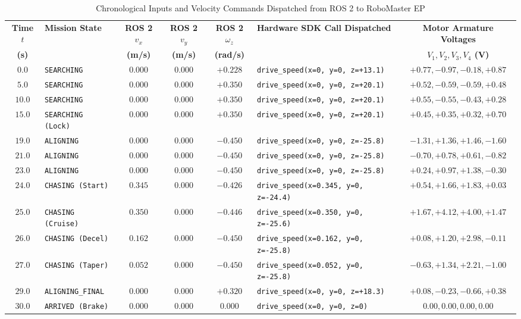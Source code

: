 \documentclass[10pt,a4paper]{article}
\begin{document}
\begin{table}[h!]
\centering
\caption{Chronological Inputs and Velocity Commands Dispatched from ROS 2 to RoboMaster EP}
\label{tab:commands_timeline}
\vspace{0.04cm}
\scriptsize
\begin{tabular*}{\textwidth}{@{\extracolsep{\fill}}c l c c c l c}
\toprule
\textbf{Time $t$} & \textbf{Mission State} & \textbf{ROS 2 $v_x$} & \textbf{ROS 2 $v_y$} & \textbf{ROS 2 $\omega_z$} & \textbf{Hardware SDK Call Dispatched} & \textbf{Motor Armature Voltages} \\
\textbf{(s)} & & \textbf{(m/s)} & \textbf{(m/s)} & \textbf{(rad/s)} & & \textbf{$V_1, V_2, V_3, V_4$ (V)} \\
\midrule
$0.0$  & \texttt{SEARCHING}       & $0.000$ & $0.000$ & $+0.228$ & \texttt{drive\_speed(x=0, y=0, z=+13.1)} & $+0.77, -0.97, -0.18, +0.87$ \\
$5.0$  & \texttt{SEARCHING}       & $0.000$ & $0.000$ & $+0.350$ & \texttt{drive\_speed(x=0, y=0, z=+20.1)} & $+0.52, -0.59, -0.59, +0.48$ \\
$10.0$ & \texttt{SEARCHING}       & $0.000$ & $0.000$ & $+0.350$ & \texttt{drive\_speed(x=0, y=0, z=+20.1)} & $+0.55, -0.55, -0.43, +0.28$ \\
$15.0$ & \texttt{SEARCHING (Lock)}& $0.000$ & $0.000$ & $+0.350$ & \texttt{drive\_speed(x=0, y=0, z=+20.1)} & $+0.45, +0.35, +0.32, +0.70$ \\
$19.0$ & \texttt{ALIGNING}        & $0.000$ & $0.000$ & $-0.450$ & \texttt{drive\_speed(x=0, y=0, z=-25.8)} & $-1.31, +1.36, +1.46, -1.60$ \\
$21.0$ & \texttt{ALIGNING}        & $0.000$ & $0.000$ & $-0.450$ & \texttt{drive\_speed(x=0, y=0, z=-25.8)} & $-0.70, +0.78, +0.61, -0.82$ \\
$23.0$ & \texttt{ALIGNING}        & $0.000$ & $0.000$ & $-0.450$ & \texttt{drive\_speed(x=0, y=0, z=-25.8)} & $+0.24, +0.97, +1.38, -0.30$ \\
$24.0$ & \texttt{CHASING (Start)} & $0.345$ & $0.000$ & $-0.426$ & \texttt{drive\_speed(x=0.345, y=0, z=-24.4)} & $+0.54, +1.66, +1.83, +0.03$ \\
$25.0$ & \texttt{CHASING (Cruise)}& $0.350$ & $0.000$ & $-0.446$ & \texttt{drive\_speed(x=0.350, y=0, z=-25.6)} & $+1.67, +4.12, +4.00, +1.47$ \\
$26.0$ & \texttt{CHASING (Decel)} & $0.162$ & $0.000$ & $-0.450$ & \texttt{drive\_speed(x=0.162, y=0, z=-25.8)} & $+0.08, +1.20, +2.98, -0.11$ \\
$27.0$ & \texttt{CHASING (Taper)} & $0.052$ & $0.000$ & $-0.450$ & \texttt{drive\_speed(x=0.052, y=0, z=-25.8)} & $-0.63, +1.34, +2.21, -1.00$ \\
$29.0$ & \texttt{ALIGNING\_FINAL} & $0.000$ & $0.000$ & $+0.320$ & \texttt{drive\_speed(x=0, y=0, z=+18.3)} & $+0.08, -0.23, -0.66, +0.38$ \\
$30.0$ & \texttt{ARRIVED (Brake)} & $0.000$ & $0.000$ & $0.000$  & \texttt{drive\_speed(x=0, y=0, z=0)}        & $0.00, 0.00, 0.00, 0.00$ \\
\bottomrule
\end{tabular*}
\end{table}
\vspace{-0.20cm}
\end{document}
